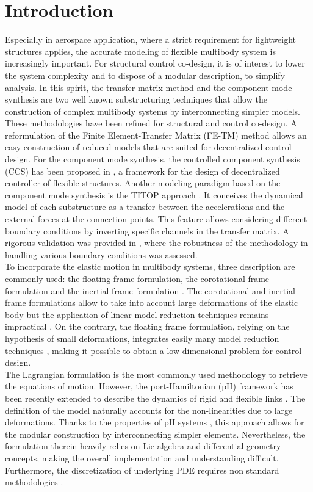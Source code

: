 \documentclass{svjour3}                     %
\begin{document}
\section{Introduction}
\label{intro}
Especially in aerospace application, where a strict requirement for lightweight structures applies, the accurate modeling  of flexible multibody system is increasingly important. For structural control co-design, it is of interest to lower the system complexity and to dispose of a modular description, to simplify analysis. In this spirit, the transfer matrix method \cite{Rui2005} and the component mode synthesis \cite{HurtyCMS} are two well known substructuring techniques that allow the construction of complex multibody systems by interconnecting simpler models. These methodologies have been refined for structural and control co-design. A reformulation of the Finite Element-Transfer Matrix (FE-TM) method \cite{TAN199047} allows an easy construction of reduced models that are suited for decentralized control design. For the component mode synthesis, the controlled component synthesis (CCS) has been proposed in \cite{YoungCMS}, a framework for the design of decentralized controller of flexible structures. Another modeling paradigm based on the component mode synthesis is the TITOP approach \cite{TITOP}. It conceives the dynamical model of each substructure as a transfer between the accelerations and the external forces at the connection points. This feature allows considering different boundary conditions by inverting specific channels in the transfer matrix. A rigorous validation was provided in \cite{Perez,SANFEDINO2018128}, where the robustness of the methodology in handling various boundary conditions was assessed. \\
\indent To incorporate the elastic motion in multibody systems, three description are commonly used: the floating frame formulation, the corotational frame formulation and the inertial frame formulation \cite{Ellenbroek2018}. The corotational and inertial frame formulations allow to take into account large deformations of the elastic body but the application of linear model reduction techniques remains impractical \cite{Noor_rev}. On the contrary, the floating frame formulation, relying on the hypothesis of small deformations, integrates easily many model reduction techniques \cite{NOWAKOWSKI201240}, making it possible to obtain a low-dimensional problem for control design. \\
\indent The Lagrangian formulation is the most commonly used methodology to retrieve the equations of motion. However, the port-Hamiltonian (pH) framework \cite{bookPHs} has been recently extended to describe the dynamics of rigid and flexible links \cite{macchelli_fl,macchelli_flrig}. The definition of the model naturally accounts for the non-linearities due to large deformations. Thanks to the properties of pH systems \cite{CerveraIntFinite},  this approach allows for the modular construction by interconnecting simpler elements. Nevertheless, the formulation therein heavily relies on Lie algebra and differential geometry concepts, making the overall implementation and understanding difficult. Furthermore, the discretization of underlying PDE requires non standard methodologies \cite{Golo}. \\
\end{document}
